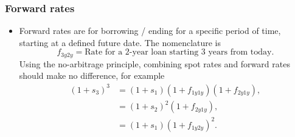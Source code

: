 \documentclass[../notes_compiled.tex]{subfiles}
\begin{document}
\subsubsection{Forward rates}
\begin{itemize}
\item Forward rates are for borrowing / ending for a specific period of time, starting at a defined future date. The nomenclature is
\begin{equation*}
f_{3y2y} = \text{Rate for a 2-year loan starting 3 years from today}.
\end{equation*}
Using the no-arbitrage principle, combining spot rates and forward rates should make no difference, for example
\begin{align*}
(1+s_{3})^{3} &= (1+s_{1})(1+f_{1y1y})(1+f_{2y1y}), \\
&= (1 + s_{2})^{2}(1+f_{2y1y}), \\
&= (1+s_{1})(1+f_{1y2y})^{2}.
\end{align*}
\end{itemize}
\end{document}
